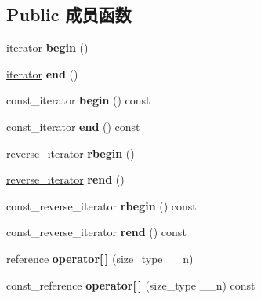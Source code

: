 \subsection*{Public 成员函数}
\begin{DoxyCompactItemize}
\item 
\mbox{\label{classdeque_a3f138e445edc68e29f8f8d338406ba89}} 
\hyperlink{structiterator}{iterator} {\bfseries begin} ()
\item 
\mbox{\label{classdeque_a1391e9f01e6d240ae3a083e760ce284b}} 
\hyperlink{structiterator}{iterator} {\bfseries end} ()
\item 
\mbox{\label{classdeque_abee8f8d17f37958b4f56d2f4c2f71edf}} 
const\+\_\+iterator {\bfseries begin} () const
\item 
\mbox{\label{classdeque_a004885c837a83910ec104ceda37f0408}} 
const\+\_\+iterator {\bfseries end} () const
\item 
\mbox{\label{classdeque_a21b60cb0c9936e92371d5ad74a59619b}} 
\hyperlink{classreverse__iterator}{reverse\+\_\+iterator} {\bfseries rbegin} ()
\item 
\mbox{\label{classdeque_a6000323ead2caf0fb56c2ea65928702f}} 
\hyperlink{classreverse__iterator}{reverse\+\_\+iterator} {\bfseries rend} ()
\item 
\mbox{\label{classdeque_a660e4820eb547ee737f5cfa9ca0f5372}} 
const\+\_\+reverse\+\_\+iterator {\bfseries rbegin} () const
\item 
\mbox{\label{classdeque_a413dcab1e427b0a5f81f14c6d3bdab1f}} 
const\+\_\+reverse\+\_\+iterator {\bfseries rend} () const
\item 
\mbox{\label{classdeque_a7c16a67c6054482aa1696308d7661937}} 
reference {\bfseries operator\mbox{[}$\,$\mbox{]}} (size\+\_\+type \+\_\+\+\_\+n)
\item 
\mbox{\label{classdeque_a7de0dc94b74d36c1f1666491f18abc77}} 
const\+\_\+reference {\bfseries operator\mbox{[}$\,$\mbox{]}} (size\+\_\+type \+\_\+\+\_\+n) const
\item 

\end{DoxyCompactItemize}
